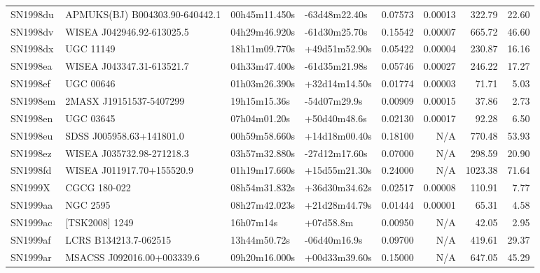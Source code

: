 \begin{longtable}{llllrrrr}
SN1998du         &  APMUKS(BJ) B004303.90-640442.1 &   00h45m11.450s &   -63d48m22.40s &  0.07573 &  0.00013 &   322.79 &       22.60 \\
SN1998dv         &       WISEA J042946.92-613025.5 &   04h29m46.920s &   -61d30m25.70s &  0.15542 &  0.00007 &   665.72 &       46.60 \\
SN1998dx         &                       UGC 11149 &   18h11m09.770s &   +49d51m52.90s &  0.05422 &  0.00004 &   230.87 &       16.16 \\
SN1998ea         &       WISEA J043347.31-613521.7 &   04h33m47.400s &   -61d35m21.98s &  0.05746 &  0.00027 &   246.22 &       17.27 \\
SN1998ef         &                       UGC 00646 &   01h03m26.390s &   +32d14m14.50s &  0.01774 &  0.00003 &    71.71 &        5.03 \\
SN1998em         &         2MASX J19151537-5407299 &    19h15m15.36s &    -54d07m29.9s &  0.00909 &  0.00015 &    37.86 &        2.73 \\
SN1998en         &                       UGC 03645 &    07h04m01.20s &    +50d40m48.6s &  0.02130 &  0.00017 &    92.28 &        6.50 \\
SN1998eu         &        SDSS J005958.63+141801.0 &   00h59m58.660s &   +14d18m00.40s &  0.18100 &      N/A &   770.48 &       53.93 \\
SN1998ez         &       WISEA J035732.98-271218.3 &   03h57m32.880s &   -27d12m17.60s &  0.07000 &      N/A &   298.59 &       20.90 \\
SN1998fd         &       WISEA J011917.70+155520.9 &   01h19m17.660s &   +15d55m21.30s &  0.24000 &      N/A &  1023.38 &       71.64 \\
SN1999X          &                    CGCG 180-022 &   08h54m31.832s &   +36d30m34.62s &  0.02517 &  0.00008 &   110.91 &        7.77 \\
SN1999aa         &                        NGC 2595 &   08h27m42.023s &   +21d28m44.79s &  0.01444 &  0.00001 &    65.31 &        4.58 \\
SN1999ac         &                  [TSK2008] 1249 &       16h07m14s &       +07d58.8m &  0.00950 &      N/A &    42.05 &        2.95 \\
SN1999af         &           LCRS B134213.7-062515 &    13h44m50.72s &    -06d40m16.9s &  0.09700 &      N/A &   419.61 &       29.37 \\
SN1999ar         &      MSACSS J092016.00+003339.6 &   09h20m16.000s &   +00d33m39.60s &  0.15000 &      N/A &   647.05 &       45.29 \\

\end{longtable}
